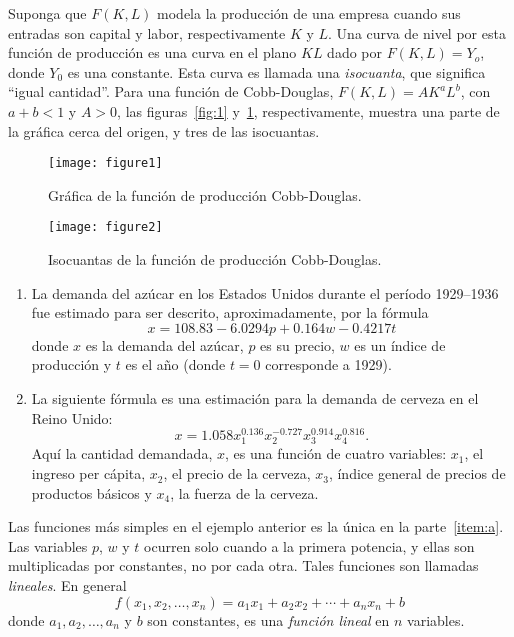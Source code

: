 \begin{example}
	Suponga que $F\left(K,L\right)$ modela la producción de una empresa cuando sus entradas son capital y labor, respectivamente $K$ y $L$. Una curva de nivel por esta función de producción es una curva en el plano $KL$ dado por $F\left(K,L\right)=Y_{o}$, donde $Y_{0}$ es una constante. Esta curva es llamada una \emph{isocuanta}, que significa ``igual cantidad''. Para una función de Cobb-Douglas, $F\left(K,L\right)=AK^{a}L^{b}$, con $a+b<1$ y $A>0$, las figuras~\ref{fig:1} y~\ref{fig:2}, respectivamente, muestra una parte de la gráfica cerca del origen, y tres de las isocuantas.
	
	\begin{figure}[ht!]
		\begin{minipage}[c]{0.4\linewidth}
			\texttt{[image: figure1]}\label{fig:1}
			\caption{Gráfica de la función de producción Cobb-Douglas.}
		\end{minipage}
		\hfill
		\begin{minipage}[c]{0.4\linewidth}
			\texttt{[image: figure2]}\label{fig:2}
			\caption{Isocuantas de la función de producción Cobb-Douglas.}
		\end{minipage}
	\end{figure}
\end{example}
\begin{example}
	\leavevmode
	\begin{enumerate}
		\item\label{item:a} La demanda del azúcar en los Estados Unidos durante el período 1929--1936 fue estimado para ser descrito, aproximadamente, por la fórmula \[ x=108.83-6.0294p+0.164w-0.4217t \] donde $x$ es la demanda del azúcar, $p$ es su precio, $w$ es un índice de producción y $t$ es el año (donde $t=0$ corresponde a 1929).
		\item\label{item:b} La siguiente fórmula es una estimación para la demanda de cerveza en el Reino Unido: \[ x=1.058{x}^{0.136}_{1}{x}^{-0.727}_{2}{x}^{0.914}_{3}x^{0.816}_{4}. \]
		Aquí la cantidad demandada, $x$, es una función de cuatro variables: $x_{1}$, el ingreso per cápita, $x_{2}$, el precio de la cerveza, $x_{3}$, índice general de precios de productos básicos y $x_{4}$, la fuerza de la cerveza.
	\end{enumerate}
\end{example}
Las funciones más simples en el ejemplo anterior es la única en la parte~\eqref{item:a}. Las variables $p$, $w$ y $t$ ocurren solo cuando a la primera potencia, y ellas son multiplicadas por constantes, no por cada otra. Tales funciones son llamadas \emph{lineales}. En general
\begin{equation}
f\left(x_{1},x_{2},\ldots,x_{n}\right)=a_{1}x_{1}+a_{2}x_{2}+\cdots+a_{n}x_{n}+b
\end{equation}
donde $a_{1},a_{2},\ldots,a_{n}$ y $b$ son constantes, es una \emph{función lineal} en $n$ variables.


